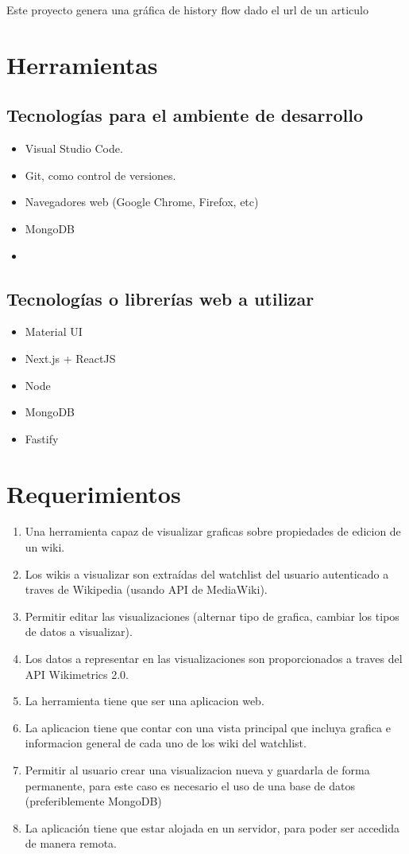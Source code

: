 Este proyecto genera una gráfica de history flow dado el url de un articulo

\section{Herramientas}

\subsection{Tecnologías para el ambiente de desarrollo}
\begin{itemize}
    \item Visual Studio Code.
    \item Git, como control de versiones.
    \item Navegadores web (Google Chrome, Firefox, etc)
    \item MongoDB
    \item
\end{itemize}

\subsection{Tecnologías o librerías web a utilizar}
\begin{itemize}
    \item Material UI
    \item Next.js + ReactJS
    \item Node
    \item MongoDB
    \item Fastify
\end{itemize}

\section{Requerimientos}
\begin{enumerate}
    \item{Una herramienta capaz de visualizar graficas sobre propiedades de edicion de un wiki.}
    \item{Los wikis a visualizar son extraídas del watchlist del usuario autenticado a traves de Wikipedia (usando API de MediaWiki).}
    \item{Permitir editar las visualizaciones (alternar tipo de grafica, cambiar los tipos de datos a visualizar).}
    \item{Los datos a representar en las visualizaciones son proporcionados a traves del API Wikimetrics 2.0.}
    \item{La herramienta tiene que ser una aplicacion web.}
    \item{La aplicacion tiene que contar con una vista principal que incluya grafica e informacion general de cada uno de los wiki del watchlist.}
    \item{Permitir al usuario crear una visualizacion nueva y guardarla de forma permanente, para este caso es necesario el uso de una base de datos (preferiblemente MongoDB)}
    \item{La aplicación tiene que estar alojada en un servidor, para poder ser accedida de manera remota.}
\end{enumerate}

